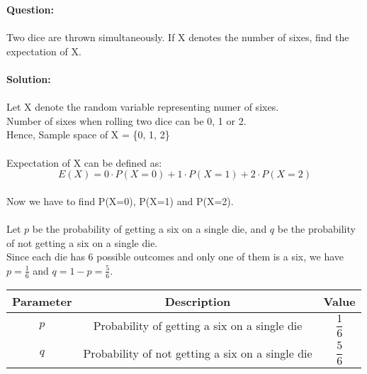 \documentclass[journal,12pt,twocolumn]{IEEEtran}
\begin{document}
\maketitle
\newpage

\bigskip
\renewcommand{\thefigure}{\theenumi}
\renewcommand{\thetable}{\theenumi}

\noindent\textbf{Question:}
\\ \\

Two dice are thrown simultaneously. If X denotes the number of sixes, find the expectation of X.
\\ \\
\noindent\textbf{Solution:}
\\ \\


Let X denote the random variable representing numer of sixes.
\\
Number of sixes when rolling two dice can be 0, 1 or 2.
\\

\noindent Hence, Sample space of X = \{0, 1, 2\} 
\\ \\
Expectation of X can be defined as:
\[ E(X) = 0 \cdot P(X=0) + 1 \cdot P(X=1) + 2 \cdot P(X=2)\]
\\
Now we have to find P(X=0), P(X=1) and P(X=2).
\\ \\
\noindent Let $p$ be the probability of getting a six on a single die, and $q$ be the probability of not getting a six on a single die.
\\
\noindent Since each die has 6 possible outcomes and only one of them is a six, we have $p = \frac{1}{6}$ and $q = 1 - p = \frac{5}{6}$.

\begin{table}[!htbp]
\centering
\begin{tabular}{|c|c|c|}
\hline
Parameter & Description & Value \\
\hline
$p$ & Probability of getting a six on a single die & $\dfrac{1}{6}$ \\
$q$ & Probability of not getting a six on a single die & $\dfrac{5}{6}$ \\
\hline
\end{tabular}

\end{table}
\end{document}
